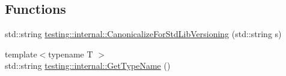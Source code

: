 \subsection*{Functions}
\begin{DoxyCompactItemize}
\item 
std\+::string \hyperlink{namespacetesting_1_1internal_a5342e843f087081705094beae07b557b}{testing\+::internal\+::\+Canonicalize\+For\+Std\+Lib\+Versioning} (std\+::string s)
\item 
{\footnotesize template$<$typename T $>$ }\\std\+::string \hyperlink{namespacetesting_1_1internal_a635606b4731f843c86ec8ca51cab83a1}{testing\+::internal\+::\+Get\+Type\+Name} ()
\end{DoxyCompactItemize}
